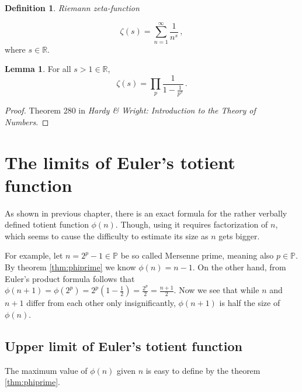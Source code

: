 \documentclass{article}
\theoremstyle{definition}
\newtheorem{definition}[subsubsection]{Definition}
\newtheorem{lemma}[subsubsection]{Lemma}
\begin{document}
\begin{definition}{\emph{Riemann zeta-function}}

\begin{equation*}
    \zeta(s)=\sum_{n=1}^\infty \frac{1}{n^s}\,,
\end{equation*}
where $s\in\mathbb{R}$.
\end{definition}

\begin{lemma}
\label{lemma:zeta}
For all $s>1\in\mathbb{R}$, 
\begin{equation*}
    \zeta(s)=\prod_p \frac{1}{1-\frac{1}{p^s}}\,.
\end{equation*}
\begin{proof}
Theorem 280 in \textit{Hardy \& Wright: Introduction to the Theory of Numbers}.
\end{proof}
\end{lemma}

\section{The limits of Euler's totient function}

As shown in previous chapter, there is an exact formula for the rather verbally defined totient function $\phi(n)$. Though, using it requires factorization of $n$, which seems to cause the difficulty to estimate its size as $n$ gets bigger.

For example, let $n = 2^p - 1 \in \mathbb{P}$ be so called Mersenne prime, meaning also $p \in \mathbb{P}$. By theorem \ref{thm:phiprime} we know $\phi(n) = n - 1$. On the other hand, from Euler's product formula follows that $\phi(n+1) = \phi(2^p) = 2^p(1-\frac{1}{2}) = \frac{2^p}{2} = \frac{n+1}{2}$. Now we see that while $n$ and $n+1$ differ from each other only insignificantly, $\phi(n+1)$ is half the size of $\phi(n)$.

\subsection{Upper limit of Euler's totient function}

The maximum value of $\phi(n)$ given $n$ is easy to define by the theorem \ref{thm:phiprime}.
\end{document}
